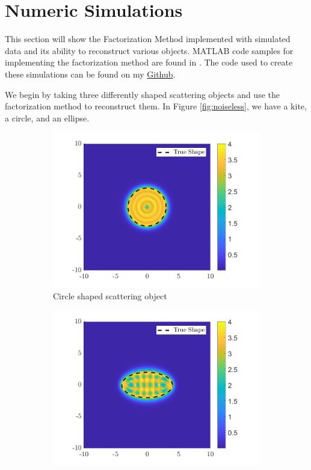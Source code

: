 \documentclass[]{article}
\begin{document}
		\section{Numeric Simulations}
			This section will show the Factorization Method implemented with simulated data and its ability to reconstruct various objects. MATLAB code samples for implementing the factorization method are found in \cite{potthast2015}. The code used to create these simulations can be found on my \href{https://github.com/KaleStahl/Honors-Project}{Github}.
			
			 We begin by taking three differently shaped scattering objects and use the factorization method to reconstruct them. In Figure \ref{fig:noiseless}, we have a kite, a circle, and an ellipse.
			\begin{figure}[h]
				\centering
				\begin{subfigure}{.3\textwidth}
					\centering
					\includegraphics[width = \textwidth]{Numeric Simulations/Images/Circle-Reconstructed}
					\caption{Circle shaped scattering object}
				\end{subfigure}
				\begin{subfigure}{.3\textwidth}
					\centering
					\includegraphics[width = \textwidth]{Numeric Simulations/Images/ellipse-Reconstructed}

\end{subfigure}
\end{figure}
\end{document}
